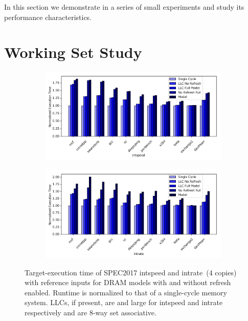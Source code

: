In this section we demonstrate \PNAME in a series of small experiments and
study its performance characteristics.

\section{Working Set Study}

\begin{figure}[t]
    \centering
    \begin{subfigure}[t]{\textwidth}
        \includegraphics[width=\columnwidth]{figures/dram_fidelity_speed_slowdown.pdf}
    \end{subfigure}
    \vspace{0.20in}
    \begin{subfigure}[t]{\textwidth}
        \includegraphics[width=\columnwidth]{figures/dram_fidelity_rate_slowdown.pdf}
    \end{subfigure}
    \caption{Target-execution time of SPEC2017 intspeed and intrate~(4 copies)
    with reference inputs for DRAM models with and without refresh enabled.
    Runtime is normalized to that of a single-cycle memory system. LLCs, if
    present, are  and  large for intspeed and
    intrate respectively and are 8-way set associative.}
    \label{fig:model-fidelity-sweep}
\end{figure}
